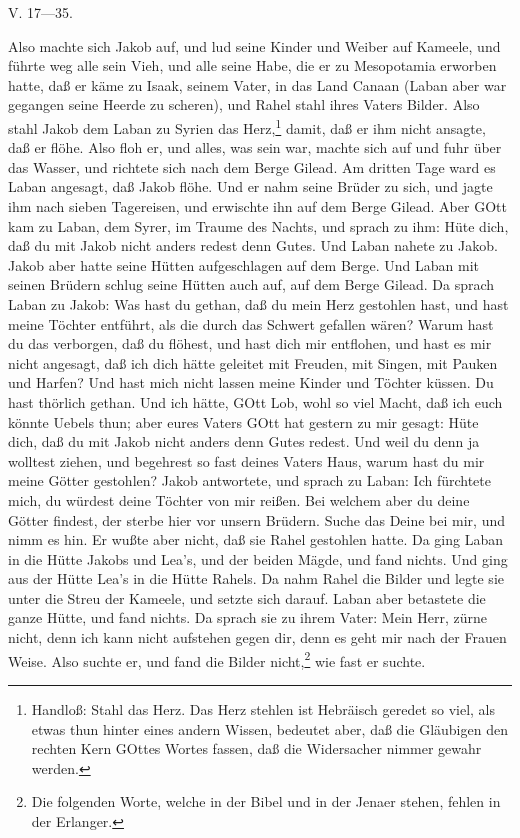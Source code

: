V. 17—35.

Also machte sich Jakob auf, und lud seine Kinder und Weiber auf Kameele, und führte weg alle sein Vieh, und alle seine Habe, die er zu Mesopotamia erworben hatte, daß er käme zu Isaak, seinem Vater, in das Land Canaan (Laban aber war gegangen seine Heerde zu scheren), und Rahel stahl ihres Vaters Bilder. Also stahl Jakob dem Laban zu Syrien das Herz,\footnote{Handloß: Stahl das Herz. Das Herz stehlen ist Hebräisch geredet so viel, als etwas thun hinter eines andern Wissen, bedeutet aber, daß die Gläubigen den rechten Kern GOttes Wortes fassen, daß die Widersacher nimmer gewahr werden.}
damit, daß er ihm nicht ansagte, daß er flöhe. Also floh er, und alles, was sein war, machte sich auf und fuhr über das Wasser, und richtete sich nach dem Berge Gilead. Am dritten Tage ward es Laban angesagt, daß Jakob flöhe. Und er nahm seine Brüder zu sich, und jagte ihm nach sieben Tagereisen, und erwischte ihn auf dem Berge Gilead. Aber GOtt kam zu Laban, dem Syrer, im Traume des Nachts, und sprach zu ihm: Hüte dich, daß du mit Jakob nicht anders redest denn Gutes. Und Laban nahete zu Jakob. Jakob aber hatte seine Hütten aufgeschlagen auf dem Berge. Und Laban mit seinen Brüdern schlug seine Hütten auch auf, auf dem Berge Gilead. Da sprach Laban zu Jakob: Was hast du gethan, daß du mein Herz gestohlen hast, und hast meine Töchter entführt, als die durch das Schwert gefallen wären? Warum hast du das verborgen, daß du flöhest, und hast dich mir entflohen, und hast es mir nicht angesagt, daß ich dich hätte geleitet mit Freuden, mit Singen, mit Pauken und Harfen? Und hast mich nicht lassen meine Kinder und Töchter küssen. Du hast thörlich gethan. Und ich hätte, GOtt Lob, wohl so viel Macht, daß ich euch könnte Uebels thun; aber eures Vaters GOtt hat gestern zu mir gesagt: Hüte dich, daß du mit Jakob nicht anders denn Gutes redest. Und weil du denn ja wolltest ziehen, und begehrest so fast deines Vaters Haus, warum hast du mir meine Götter gestohlen? Jakob antwortete, und sprach zu Laban: Ich fürchtete mich, du würdest deine Töchter von mir reißen. Bei welchem aber du deine Götter findest, der sterbe hier vor unsern Brüdern. Suche das Deine bei mir, und nimm es hin. Er wußte aber nicht, daß sie Rahel gestohlen hatte. Da ging Laban in die Hütte Jakobs und Lea’s, und der beiden Mägde, und fand nichts. Und ging aus der Hütte Lea’s in die Hütte Rahels. Da nahm Rahel die Bilder und legte sie unter die Streu der Kameele, und setzte sich darauf. Laban aber betastete die ganze Hütte, und fand nichts. Da sprach sie zu ihrem Vater: Mein Herr, zürne nicht, denn ich kann nicht aufstehen gegen dir, denn es geht mir nach der Frauen Weise. Also suchte er, und fand die Bilder nicht,\footnote{Die folgenden Worte, welche in der Bibel und in der Jenaer stehen, fehlen in der Erlanger.} wie fast er suchte.


